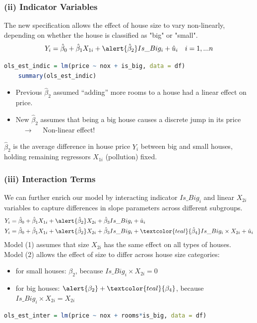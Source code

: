 \documentclass[11pt, aspectratio = 169]{beamer}
\begin{document}
\begin{frame}[fragile]
\frametitle{(ii) Indicator Variables}
The new specification allows the effect of house size to vary non-linearly, depending on whether the house is classified as "big" or "small".
\[
Y_i = \hat{\beta}_0 + \hat{\beta}_1 X_{1i} + \alert{\hat{\beta}_2} Is\_Big_i + \hat{u}_{i} \quad i = 1, ... n
\]
\begin{lstlisting}[language=R]
    ols_est_indic = lm(price ~ nox + is_big, data = df)
    summary(ols_est_indic)
\end{lstlisting}
\pause
\begin{itemize}
    \item Previous $\hat{\beta}_2$ assumed ``adding'' more rooms to a house had a \alert{linear} effect on price.
    \item New \alert{$\hat{\beta}_2$} assumes that being a big house causes a discrete jump in its price $\quad \rightarrow \quad$ \alert{Non-linear effect!} 
\end{itemize}
\pause
\alert{$\hat{\beta}_2$} is the average difference in house price $Y_i$ between big and small houses, holding remaining regressors $X_{1i}$ (pollution) fixed.
\end{frame}

\begin{frame}[fragile]
\frametitle{(iii) Interaction Terms}
We can further enrich our model by interacting indicator $Is\_Big_i$ and linear $X_{2i}$ variables to capture differences in slope parameters across different subgroups.
\begin{align}
    Y_i &= \hat{\beta}_0 + \hat{\beta}_1 X_{1i} + \alert{\hat{\beta}_2} X_{2i} + \hat{\beta}_3 Is\_Big_i + \hat{u}_{i} \\ 
    Y_i &= \hat{\beta}_0 + \hat{\beta}_1 X_{1i} + \alert{\hat{\beta}_2} X_{2i} + \hat{\beta}_3 Is\_Big_i + \textcolor{teal}{\hat{\beta}_4} Is\_Big_i \times X_{2i} + \hat{u}_{i}
\end{align}
\pause
Model (1) assumes that size $X_{2i}$ has the same effect on all types of houses. \\
\pause
Model (2) allows the effect of size to differ across house size categories:
\begin{itemize}
    \item for small houses: \alert{$\beta_2$}, because $Is\_Big_i \times X_{2i} = 0$
    \item for big houses: $\alert{\beta_2} + \textcolor{teal}{\beta_4}$, because $Is\_Big_i \times X_{2i} = X_{2i}$
\end{itemize}
\pause
\begin{lstlisting}[language=R]
    ols_est_inter = lm(price ~ nox + rooms*is_big, data = df)
\end{lstlisting}    
\end{frame}
\end{document}
